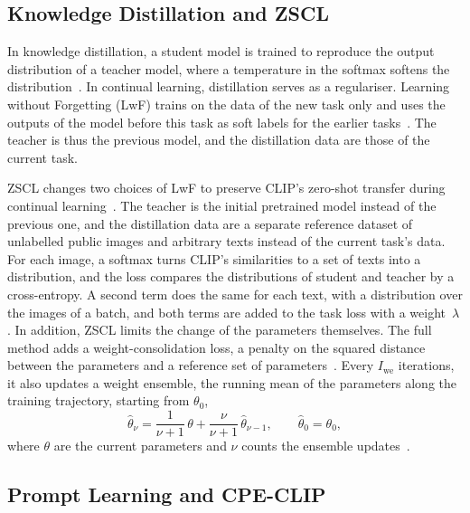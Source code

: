 \subsection{Knowledge Distillation and ZSCL}
\label{subsec:bg-zscl}

In knowledge distillation, a student model is trained to reproduce the output distribution of a teacher model, where a temperature in the softmax softens the distribution~\cite[Sec.~2]{hinton2015distilling}.
In continual learning, distillation serves as a regulariser.
Learning without Forgetting (LwF) trains on the data of the new task only and uses the outputs of the model before this task as soft labels for the earlier tasks~\cite{li2017learningforgetting}.
The teacher is thus the previous model, and the distillation data are those of the current task.

ZSCL changes two choices of LwF to preserve CLIP's zero-shot transfer during continual learning~\cite[Sec.~3.2, Eqs.~2--4]{zheng2023preventingzeroshottransferdegradation}.
The teacher is the initial pretrained model instead of the previous one, and the distillation data are a separate reference dataset of unlabelled public images and arbitrary texts instead of the current task's data.
For each image, a softmax turns CLIP's similarities to a set of texts into a distribution, and the loss compares the distributions of student and teacher by a cross-entropy.
A second term does the same for each text, with a distribution over the images of a batch, and both terms are added to the task loss with a weight~$\lambda$.
In addition, ZSCL limits the change of the parameters themselves.
The full method adds a weight-consolidation loss, a penalty on the squared distance between the parameters and a reference set of parameters~\cite[Sec.~3.3, Eq.~5, Table~2]{zheng2023preventingzeroshottransferdegradation}.
Every $I_{\mathrm{we}}$ iterations, it also updates a weight ensemble, the running mean of the parameters along the training trajectory, starting from $\theta_0$,
\begin{equation}
\hat{\theta}_\nu = \frac{1}{\nu+1}\,\theta + \frac{\nu}{\nu+1}\,\hat{\theta}_{\nu-1}, \qquad \hat{\theta}_0 = \theta_0,
\label{eq:bg-we}
\end{equation}
where $\theta$ are the current parameters and $\nu$ counts the ensemble updates~\cite[Sec.~3.3, Eq.~7]{zheng2023preventingzeroshottransferdegradation}.

\subsection{Prompt Learning and CPE-CLIP}
\label{subsec:bg-prompt}

